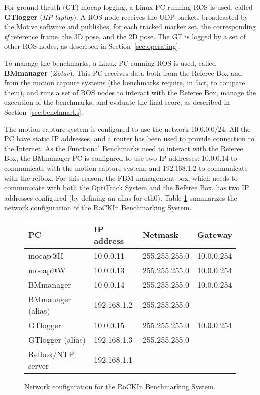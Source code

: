 \documentclass[a4paper]{article}
\newcommand{\rbs}{RoCKIn Benchmarking System}
\begin{document}
For ground thruth (GT) mocap logging, a Linux PC running ROS is used, called \textbf{GTlogger} (\textit{HP laptop}). A ROS node receives the UDP packets broadcasted by the Motive software and publishes, for each tracked marker set, the corresponding \emph{tf} reference frame, the 3D pose, and the 2D pose. The GT is logged by a set of other ROS nodes, as described in Section~\ref{sec:operating}.

To manage the benchmarks, a Linux PC running ROS is used, called \textbf{BMmanager} (\textit{Zotac}). This PC receives data both from the Referee Box and from the motion capture systems (the benchmarks require, in fact, to compare them), and runs a set of ROS nodes to interact with the Referee Box, manage the execution of the benchmarks, and evaluate the final score, as described in Section~\ref{sec:benchmarks}.

The motion capture system is configured to use the network 10.0.0.0/24.
All the PC have static IP addresses, and a router has been used to provide connection to the Internet.
As the Functional Benchmarks need to interact with the Referee Box, the BMmanager PC is configured to use two IP addresses: 10.0.0.14 to communicate with the motion capture system, and 192.168.1.2 to communicate with the refbox.
For this reason, the FBM management box, which needs to communicate with both the OptiTrack System and the Referee Box, has two IP addresses configured (by defining an alias for eth0).
Table \ref{tab:network} summarizes the network configuration of the \rbs.
\\

\begin{figure}[h!]
\label{tab:network}
  \begin{tabular}{llll}
  \toprule
  PC                     & IP address  & Netmask        & Gateway    \\
  \midrule
  mocap@H                & 10.0.0.11   & 255.255.255.0 & 10.0.0.254 \\
  mocap@W                & 10.0.0.13   & 255.255.255.0 & 10.0.0.254 \\
  BMmanager              & 10.0.0.14   & 255.255.255.0 & 10.0.0.254 \\
  BMmanager (alias)      & 192.168.1.2 & 255.255.255.0 &            \\
  GTlogger               & 10.0.0.15   & 255.255.255.0 & 10.0.0.254 \\
  GTlogger (alias)       & 192.168.1.3 & 255.255.255.0 &            \\
  Refbox/NTP server      & 192.168.1.1 &               &            \\
  \bottomrule
  \end{tabular}
  \caption{Network configuration for the \rbs.}
\end{figure}
\end{document}
